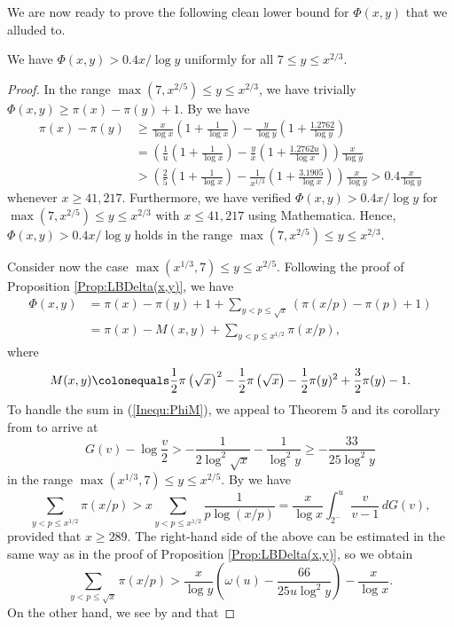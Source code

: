 \documentclass[12pt,reqno]{amsart}
\begin{document}
We are now ready to prove the following clean lower bound for $\Phi(x,y)$ that we alluded to.
\begin{thm}\label{thm:0.4LB}
We have $\Phi(x,y)>0.4x/\log y$ uniformly for all $7\le y\le x^{2/3}$.
\end{thm}
\begin{proof}
In the range $\max(7,x^{2/5})\le y\le x^{2/3}$, we have trivially $\Phi(x,y)\ge \pi(x)-\pi(y)+1$. By \cite[Corollary 5.2]{D} we have
\begin{align*}
\pi(x)-\pi(y)&\ge\frac{x}{\log x}\left(1+\frac{1}{\log x}\right)-\frac{y}{\log y}\left(1+\frac{1.2762}{\log y}\right)\\
&=\left(\frac{1}{u}\left(1+\frac{1}{\log x}\right)-\frac{y}{x}\left(1+\frac{1.2762u}{\log x}\right)\right)\frac{x}{\log y}\\
&>\left(\frac{2}{5}\left(1+\frac{1}{\log x}\right)-\frac{1}{x^{1/3}}\left(1+\frac{3.1905}{\log x}\right)\right)\frac{x}{\log y}>0.4\frac{x}{\log y}
\end{align*}
whenever $x\ge41{,}217$. Furthermore, we have verified $\Phi(x,y)>0.4x/\log y$ for $\max(7,x^{2/5})\le y\le x^{2/3}$ with $x\le41{,}217$ using Mathematica. Hence, $\Phi(x,y)>0.4x/\log y$ holds in the range $\max(7,x^{2/5})\le y\le x^{2/3}$.
\par Consider now the case $\max(x^{1/3},7)\le y\le x^{2/5}$. Following the proof of Proposition \ref{Prop:LBDelta(x,y)}, we have
\begin{align}\label{Inequ:PhiM}
\Phi(x,y)&=\pi(x)-\pi(y)+1+ \sum_{y<p\leq \sqrt{x}}(\pi(x/p)-\pi(p)+1)\nonumber\\
&=\pi(x)-M(x,y)+\sum_{y<p\le x^{1/2}}\pi(x/p),
\end{align}
where
\[M(x,y)\colonequals\frac{1}{2}\pi\left(\sqrt{x}\right)^2-\frac{1}{2}\pi\left(\sqrt{x}\right)-\frac{1}{2}\pi(y)^2+\frac{3}{2}\pi(y)-1.\]
To handle the sum in (\ref*{Inequ:PhiM}), we appeal to Theorem 5 and its corollary from \cite{RS} to arrive at
\[G(v)-\log\frac{v}{2}>-\frac{1}{2\log^2\sqrt{x}}-\frac{1}{\log^2 y}\ge-\frac{33}{25\log^2y}\]
in the range $\max(x^{1/3},7)\le y\le x^{2/5}$. By \cite[Corollary 1]{RS} we have
\[\sum_{y<p\le x^{1/2}}\pi(x/p)>x\sum_{y<p\le x^{1/2}}\frac{1}{p\log(x/p)}=\frac{x}{\log x}\int_{2^-}^{u}\frac{v}{v-1}\,dG(v),\]
provided that $x\ge289$. The right-hand side of the above can be estimated in the same way as in the proof of Proposition \ref{Prop:LBDelta(x,y)}, so we obtain
\[\sum_{y<p\le \sqrt{x}}\pi(x/p)> \frac{x}{\log y}\left(\omega(u)-\frac{66}{25u\log^2y}\right)-\frac{x}{\log x}.\]
On the other hand, we see by \cite[Corollary 5.2]{D} and \cite[Corollary 2]{RS} that

\end{proof}
\end{document}
